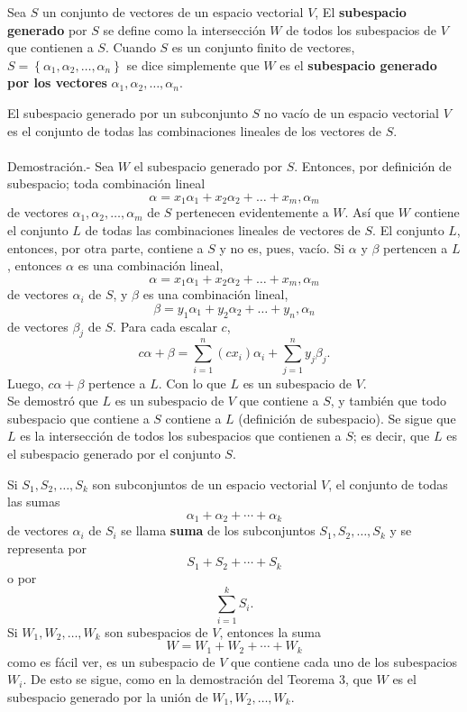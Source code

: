 \begin{def.}
    Sea $S$ un conjunto de vectores de un espacio vectorial $V$, El \textbf{subespacio generado} por $S$ se define como la intersección $W$ de todos los subespacios de $V$ que contienen a $S$. Cuando $S$ es un conjunto finito de vectores, $S=\left\{\alpha_1,\alpha_2,\ldots,\alpha_n\right\}$ se dice simplemente que $W$ es el \textbf{subespacio generado por los vectores} $\alpha_1,\alpha_2,\ldots,\alpha_n$.
\end{def.}

\begin{teo}
    El subespacio generado por un subconjunto $S$ no vacío de un espacio vectorial $V$ es el conjunto de todas las combinaciones lineales de los vectores de $S$.\\\\
	Demostración.-\; Sea $W$ el subespacio generado por $S$. Entonces, por definición de subespacio; toda combinación lineal 
	$$\alpha=x_1\alpha_1+x_2\alpha_2+\ldots+x_m,\alpha_m$$
	de vectores $\alpha_1,\alpha_2,\ldots,\alpha_m$ de $S$ pertenecen evidentemente a $W$. Así que $W$ contiene el conjunto $L$ de todas las combinaciones lineales de vectores de $S$. El conjunto $L$, entonces, por otra parte, contiene a $S$ y no es, pues, vacío. Si $\alpha$ y $\beta$ pertencen a $L$, entonces $\alpha$ es una combinación lineal,
	$$\alpha=x_1\alpha_1+x_2\alpha_2+\ldots+x_m,\alpha_m$$
	de vectores $\alpha_i$ de $S$, y $\beta$ es una combinación lineal,
	$$\beta=y_1\alpha_1+y_2\alpha_2+\ldots+y_n,\alpha_n$$
	de vectores $\beta_j$ de $S$. Para cada escalar $c$,
	$$c\alpha+\beta=\sum_{i=1}^n (cx_i)\alpha_i+\sum_{j=1}^n y_j\beta_j.$$
	Luego, $c\alpha+\beta$ pertence a $L$. Con lo que $L$ es un subespacio de $V$.\\
	Se demostró que $L$ es un subespacio de $V$ que contiene a $S$, y también que todo subespacio que contiene a $S$ contiene a $L$ (definición de subespacio). Se sigue que $L$ es la intersección de todos los subespacios que contienen a $S$; es decir, que $L$ es el subespacio generado por el conjunto $S$.
\end{teo}

\begin{def.}
    Si $S_1,S_2,\ldots,S_k$ son subconjuntos de un espacio vectorial $V$, el conjunto de todas las sumas 
    $$\alpha_1+\alpha_2+\cdots + \alpha_k$$
    de vectores $\alpha_i$ de $S_i$ se llama \textbf{suma} de los subconjuntos $S_1,S_2,\ldots , S_k$ y se representa por
    $$S_1+S_2+\cdots + S_k$$
    o por
    $$\sum_{i=1}^k S_i.$$
    Si $W_1,W_2,\ldots,W_k$ son subespacios de $V$, entonces la suma
    $$W=W_1+W_2+\cdots + W_k$$
    como es fácil ver, es un subespacio de $V$ que contiene cada uno de los subespacios $W_i$. De esto se sigue, como en la demostración del Teorema 3, que $W$ es el subespacio generado por la unión de $W_1,W_2,\ldots , W_k$.
\end{def.}


